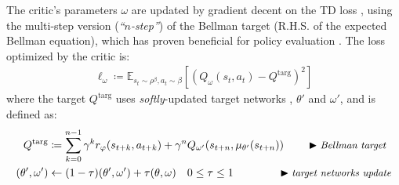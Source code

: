 The critic's parameters $\omega$ are updated by gradient decent on the
TD loss \cite{Sutton1988-to}, using the
multi-step version \cite{Peng1996-xn} (\textit{``$n$-step''})
of the Bellman target (R.H.S. of the expected Bellman equation),
which has proven beneficial for policy evaluation
\cite{Hessel2017-ns,Fernando_Hernandez-Garcia2019-bk}.
The loss optimized by the critic is:
\begin{align}
\ell_\omega \coloneqq \mathbb{E}_{s_t \sim \rho^\beta, a_t \sim \beta}[
(Q_\omega(s_t, a_t)
- Q^\text{targ})^2]
\label{omegaloss}
\end{align}
where the target $Q^\text{targ}$ uses \textit{softly}-updated \cite{Lillicrap2016-xa}
target networks \cite{Mnih2013-rb,Mnih2015-iy},
$\theta'$ and $\omega'$, and is defined as:
\begin{align}
Q^\text{targ} &\coloneqq
\sum_{k=0}^{n-1} \gamma^{k} r_\varphi(s_{t+k}, a_{t+k})
+ \gamma^n Q_{\omega'} (s_{t+n}, \mu_{\theta'}(s_{t+n}))
\qquad
\blacktriangleright\text{\small{\textit{Bellman target}}} \\
(\theta',\omega') &\leftarrow (1 - \tau) (\theta',\omega') + \tau (\theta,\omega)
\quad 0 \leq \tau \leq 1
\qquad \qquad
\blacktriangleright\text{\small{\textit{target networks update}}}
\end{align}

